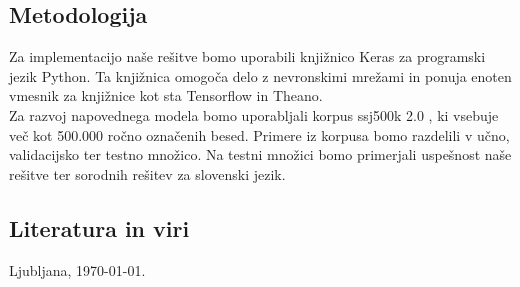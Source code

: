 \documentclass[a4paper, 12pt]{article}
\begin{document}
\subsection{Metodologija}

Za implementacijo naše rešitve bomo uporabili knjižnico Keras za programski jezik Python. Ta knjižnica omogoča delo z nevronskimi mrežami in ponuja enoten vmesnik za knjižnice kot sta Tensorflow in Theano.\\
Za razvoj napovednega modela bomo uporabljali korpus ssj500k 2.0 \cite{ssj500kv2}, ki vsebuje več kot 500.000 ročno označenih besed. Primere iz korpusa bomo razdelili v učno, validacijsko ter testno množico. Na testni množici bomo primerjali uspešnost naše rešitve ter sorodnih rešitev za slovenski jezik.

\subsection{Literatura in viri}
\label{literatura}

\renewcommand\refname{}
\vspace{-50px}




\bigskip

Ljubljana, \today .
\end{document}

